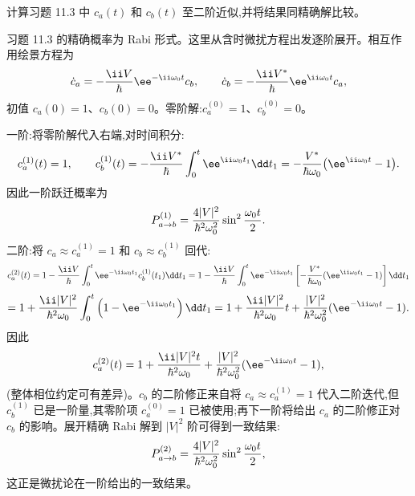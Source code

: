 \begin{question}
计算习题 11.3 中 $c_a(t)$ 和 $c_b(t)$ 至二阶近似,并将结果同精确解比较。
\end{question}
\begin{solution}
习题 11.3 的精确概率为 Rabi 形式。这里从含时微扰方程出发逐阶展开。相互作用绘景方程为
\[
\dot c_a=-{\ii V\over\hbar}\ee^{-\ii\omega_0t}c_b,\qquad
\dot c_b=-{\ii V^*\over\hbar}\ee^{\ii\omega_0t}c_a,
\]
初值 $c_a(0)=1$、$c_b(0)=0$。零阶解:$c_a^{(0)}=1$、$c_b^{(0)}=0$。

一阶:将零阶解代入右端,对时间积分:
\[
c_a^{(1)}(t)=1,\qquad
c_b^{(1)}(t)=-{\ii V^*\over\hbar}\int_0^t \ee^{\ii\omega_0t_1}\dd t_1
=-{V^*\over\hbar\omega_0}\big(\ee^{\ii\omega_0t}-1\big).
\]
因此一阶跃迁概率为
\[
P_{a\to b}^{(1)}={4|V|^2\over\hbar^2\omega_0^2}\sin^2{\omega_0t\over2}.
\]
二阶:将 $c_a\approx c_a^{(1)}=1$ 和 $c_b\approx c_b^{(1)}$ 回代:
\[
c_a^{(2)}(t)=1-{\ii V\over\hbar}\int_0^t \ee^{-\ii\omega_0t_1}c_b^{(1)}(t_1)\dd t_1
=1-{\ii V\over\hbar}\int_0^t \ee^{-\ii\omega_0t_1}\left[-{V^*\over\hbar\omega_0}(\ee^{\ii\omega_0t_1}-1)\right]\dd t_1
\]
\[
=1+{\ii|V|^2\over\hbar^2\omega_0}\int_0^t\left(1-\ee^{-\ii\omega_0t_1}\right)\dd t_1
=1+{\ii|V|^2\over\hbar^2\omega_0}t+{|V|^2\over\hbar^2\omega_0^2}(\ee^{-\ii\omega_0t}-1).
\]
因此
\[
c_a^{(2)}(t)=1+{\ii |V|^2t\over\hbar^2\omega_0}+{ |V|^2\over\hbar^2\omega_0^2}(\ee^{-\ii\omega_0t}-1),
\]
(整体相位约定可有差异)。$c_b$ 的二阶修正来自将 $c_a\approx c_a^{(1)}=1$ 代入二阶迭代,但 $c_b^{(1)}$ 已是一阶量,其零阶项 $c_a^{(0)}=1$ 已被使用;再下一阶将给出 $c_a$ 的二阶修正对 $c_b$ 的影响。展开精确 Rabi 解到 $|V|^2$ 阶可得到一致结果:
\[
P_{a\to b}^{(2)}={4|V|^2\over\hbar^2\omega_0^2}\sin^2{\omega_0t\over2},
\]
这正是微扰论在一阶给出的一致结果。
\end{solution}

